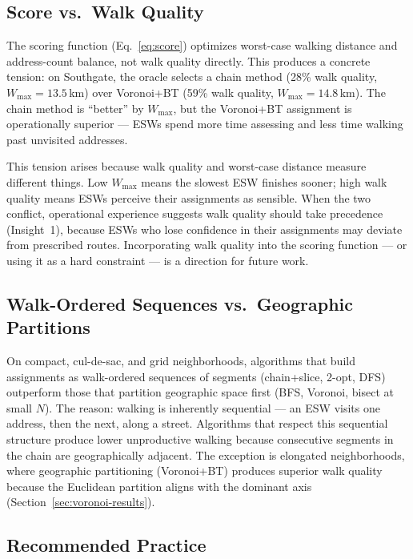 \documentclass[conference]{IEEEtran}
\begin{document}
\subsection{Score vs.\ Walk Quality}

The scoring function (Eq.~\ref{eq:score}) optimizes worst-case walking distance and address-count balance, not walk quality directly. This produces a concrete tension: on Southgate, the oracle selects a chain method (28\% walk quality, $W_{\max} = 13.5$\,km) over Voronoi+BT (59\% walk quality, $W_{\max} = 14.8$\,km). The chain method is ``better'' by $W_{\max}$, but the Voronoi+BT assignment is operationally superior --- ESWs spend more time assessing and less time walking past unvisited addresses.

This tension arises because walk quality and worst-case distance measure different things. Low $W_{\max}$ means the slowest ESW finishes sooner; high walk quality means ESWs perceive their assignments as sensible. When the two conflict, operational experience suggests walk quality should take precedence (Insight~1), because ESWs who lose confidence in their assignments may deviate from prescribed routes. Incorporating walk quality into the scoring function --- or using it as a hard constraint --- is a direction for future work.

\subsection{Walk-Ordered Sequences vs.\ Geographic Partitions}

On compact, cul-de-sac, and grid neighborhoods, algorithms that build assignments as walk-ordered sequences of segments (chain+slice, 2-opt, DFS) outperform those that partition geographic space first (BFS, Voronoi, bisect at small $N$). The reason: walking is inherently sequential --- an ESW visits one address, then the next, along a street. Algorithms that respect this sequential structure produce lower unproductive walking because consecutive segments in the chain are geographically adjacent. The exception is elongated neighborhoods, where geographic partitioning (Voronoi+BT) produces superior walk quality because the Euclidean partition aligns with the dominant axis (Section~\ref{sec:voronoi-results}).

\subsection{Recommended Practice}
\end{document}
